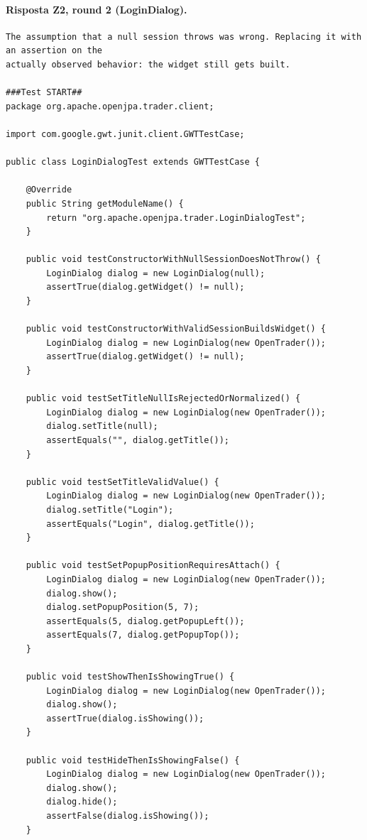 \paragraph*{Risposta Z2, round 2 (LoginDialog).}
\label{risposta:ld-z2-r2}
\begin{lstlisting}
The assumption that a null session throws was wrong. Replacing it with an assertion on the
actually observed behavior: the widget still gets built.

###Test START##
package org.apache.openjpa.trader.client;

import com.google.gwt.junit.client.GWTTestCase;

public class LoginDialogTest extends GWTTestCase {

    @Override
    public String getModuleName() {
        return "org.apache.openjpa.trader.LoginDialogTest";
    }

    public void testConstructorWithNullSessionDoesNotThrow() {
        LoginDialog dialog = new LoginDialog(null);
        assertTrue(dialog.getWidget() != null);
    }

    public void testConstructorWithValidSessionBuildsWidget() {
        LoginDialog dialog = new LoginDialog(new OpenTrader());
        assertTrue(dialog.getWidget() != null);
    }

    public void testSetTitleNullIsRejectedOrNormalized() {
        LoginDialog dialog = new LoginDialog(new OpenTrader());
        dialog.setTitle(null);
        assertEquals("", dialog.getTitle());
    }

    public void testSetTitleValidValue() {
        LoginDialog dialog = new LoginDialog(new OpenTrader());
        dialog.setTitle("Login");
        assertEquals("Login", dialog.getTitle());
    }

    public void testSetPopupPositionRequiresAttach() {
        LoginDialog dialog = new LoginDialog(new OpenTrader());
        dialog.show();
        dialog.setPopupPosition(5, 7);
        assertEquals(5, dialog.getPopupLeft());
        assertEquals(7, dialog.getPopupTop());
    }

    public void testShowThenIsShowingTrue() {
        LoginDialog dialog = new LoginDialog(new OpenTrader());
        dialog.show();
        assertTrue(dialog.isShowing());
    }

    public void testHideThenIsShowingFalse() {
        LoginDialog dialog = new LoginDialog(new OpenTrader());
        dialog.show();
        dialog.hide();
        assertFalse(dialog.isShowing());
    }


\end{lstlisting}
